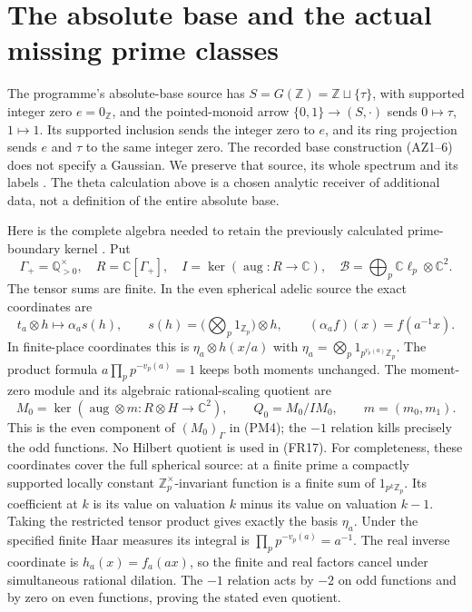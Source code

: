 \documentclass[11pt]{article}
\newcommand{\C}{\mathbb C}\newcommand{\R}{\mathbb R}
\newcommand{\Z}{\mathbb Z}\newcommand{\Q}{\mathbb Q}
\begin{document}
\section{The absolute base and the actual missing prime classes}
The programme's absolute-base source has $S=G(\Z)=\Z\sqcup\{\tau\}$, with supported integer zero $e=0_\Z$, and the pointed-monoid arrow $\{0,1\}\to(S,\cdot)$ sends $0\mapsto\tau$, $1\mapsto1$. Its supported inclusion sends the integer zero to $e$, and its ring projection sends $e$ and $\tau$ to the same integer zero. The recorded base construction (AZ1--6) does not specify a Gaussian. We preserve that source, its whole spectrum and its labels \cite{AZ}. The theta calculation above is a chosen analytic receiver of additional data, not a definition of the entire absolute base.

Here is the complete algebra needed to retain the previously calculated prime-boundary kernel \cite{PM}. Put
\begin{equation}
 \Gamma_+=\Q_{>0}^{\times},\quad R=\C[\Gamma_+],\quad
 I=\ker(\operatorname{aug}:R\to\C),\quad
 \mathcal B=\bigoplus_p\C\ell_p\otimes\C^2.
 \tag{FR15}
\end{equation}
The tensor sums are finite. In the even spherical adelic source the exact coordinates are
\begin{equation}
 t_a\otimes h\longmapsto\alpha_a s(h),\qquad
 s(h)=\Big(\bigotimes_p1_{\Z_p}\Big)\otimes h,\qquad
 (\alpha_a f)(x)=f(a^{-1}x).
 \tag{FR16}
\end{equation}
In finite-place coordinates this is $\eta_a\otimes h(x/a)$ with
$\eta_a=\bigotimes_p1_{p^{v_p(a)}\Z_p}$. The product formula
$a\prod_p p^{-v_p(a)}=1$ keeps both moments unchanged. The moment-zero module and its algebraic rational-scaling quotient are
\begin{equation}
 M_0=\ker(\operatorname{aug}\otimes m:R\otimes H\to\C^2),
 \qquad Q_0=M_0/IM_0,\qquad m=(m_0,m_1).
 \tag{FR17}
\end{equation}
This is the even component of $(M_0)_\Gamma$ in (PM4); the $-1$ relation kills precisely the odd functions. No Hilbert quotient is used in (FR17).
For completeness, these coordinates cover the full spherical source: at a finite prime a compactly supported locally constant $\Z_p^\times$-invariant function is a finite sum of $1_{p^k\Z_p}$. Its coefficient at $k$ is its value on valuation $k$ minus its value on valuation $k-1$. Taking the restricted tensor product gives exactly the basis $\eta_a$. Under the specified finite Haar measures its integral is $\prod_pp^{-v_p(a)}=a^{-1}$. The real inverse coordinate is $h_a(x)=f_a(ax)$, so the finite and real factors cancel under simultaneous rational dilation. The $-1$ relation acts by $-2$ on odd functions and by zero on even functions, proving the stated even quotient.
\end{document}
